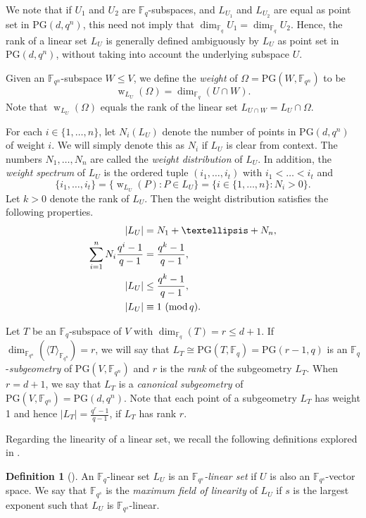 \documentclass[11pt]{article}
\theoremstyle{definition}
\newtheorem{definition}[theorem]{Definition}
\newcommand{\fqn}{\mathbb{F}_{q^n}}
\newcommand{\F}{{\mathbb F}}
\newcommand{\fq}{{\mathbb F}_{q}}
\renewcommand{\mod}{\hbox{{\rm mod}\,}}
\newcommand{\PG}{\mathrm{PG}}
\DeclareMathOperator{\ww}{w}
\begin{document}
We note that if $U_1$ and $U_2$ are $\fq$-subspaces, and $L_{U_1}$ and $L_{U_2}$ are equal as point set in $\PG(d,q^n)$, this need not imply that $\dim_{\fq} U_1 = \dim_{\fq} U_2$.
Hence, the rank of a linear set $L_U$ is generally defined ambiguously by $L_U$ as point set in $\PG(d,q^n)$, without taking into account the underlying subspace $U$.

Given an $\fqn$-subspace $W \leq V$, we define the \emph{weight} of $\Omega = \PG(W,\fqn)$ to be
\[
 \ww_{L_U}(\Omega) = \dim_{\fq} (U \cap W).
\]
Note that $\ww_{L_U}(\Omega)$ equals the rank of the linear set $L_{U \cap W} = L_U \cap \Omega$.

For each $i \in \{1,\dots,n\}$, let $N_i(L_U)$ denote the number of points in $\PG(d,q^n)$ of weight $i$.
We will simply denote this as $N_i$ if $L_U$ is clear from context.
The numbers $N_1, \dots, N_n$ are called the \emph{weight distribution} of $L_U$.
In addition, the \emph{weight spectrum} of $L_U$ is the ordered tuple $(i_1,\dots,i_t)$ with $i_1 < \ldots < i_t$ and
\[
 \{ i_1, \dots, i_t \} = \{ \ww_{L_U}(P) : P \in L_U \} = \{ i \in \{1,\dots,n\} : N_i > 0\}.
\]
Let $k>0$ denote the rank of $L_U$.
Then the weight distribution satisfies the following properties.
\begin{align}
    |L_U| &=N_1+\ldots+N_n, \label{eq:pesicard} \\
    \sum_{i=1}^n N_i \frac{q^i-1}{q-1}&=\frac{q^k-1}{q-1}, \label{eq:pesivett} \\
    |L_U| &\leq \frac{q^k-1}{q-1}, \label{eq:card} \\
    |L_U| &\equiv 1 \ (\mod q). \label{eq:modqsize}
\end{align}

Let $T$ be an $\F_q$-subspace of $V$ with $\dim_{\F_q}(T)=r \leq d+1$.
If $\dim_{\F_{q^n}}(\langle T \rangle_{\F_{q^n}})=r$, we will say that $L_T \cong \PG(T,\F_q)=\PG(r-1,q)$ is an $\fq$-\emph{subgeometry} of $\PG(V,\F_{q^n})$ and $r$ is the \emph{rank} of the subgeometry $L_T$.
When $r=d+1$, we say that $L_T$ is a \emph{canonical subgeometry} of $\PG(V,\fqn)=\PG(d,q^n)$. 
Note that each point of a subgeometry $L_T$ has weight 1 and hence $\lvert L_T \rvert =\frac{q^{r}-1}{q-1}$, if $L_T$ has rank $r$.

Regarding the linearity of a linear set, we recall the following definitions explored in \cite{Jena2021thegeometricfield}.

\begin{definition}[{\cite[Definitions 1.1, 1.2]{Jena2021thegeometricfield}}]
An $\F_{q}$-linear set $L_U$ is  an \emph{$\F_{q^s}$-linear set} if $U$ is also an $\F_{q^s}$-vector space. 
We say that $\F_{q^s}$ is the \emph{maximum field of linearity} of $L_U$ if $s$ is the largest exponent such that $L_U$ is $\F_{q^s}$-linear.
\end{definition}
\end{document}
